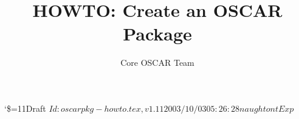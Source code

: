 \documentclass[letterpaper]{article}
\title{HOWTO: Create an OSCAR Package}
\author{Core OSCAR Team}
\begin{document}
\maketitle

\begin{center}
  {\catcode`\$=11\tiny\noindent Draft $Id: oscarpkg-howto.tex,v 1.11 2003/10/03 05:26:28 naughtont Exp $}
\end{center}

\tableofcontents

\newpage



















%
%


%
%
\newpage   %
\appendix








%
\end{document}
